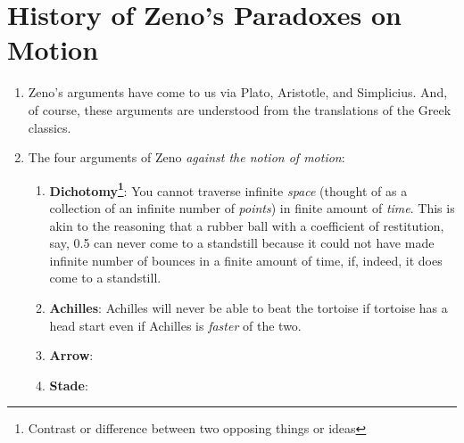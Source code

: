 \documentclass[12pt,a4paper]{book}
\begin{document}
\chapter{History of Zeno's Paradoxes on Motion}
\label{zeno}
\begin{enumerate}
    \item Zeno's arguments have come to us via Plato, Aristotle, and Simplicius. And, of course, these arguments are understood from the translations of the Greek classics.
    \item The four arguments of Zeno \emph{against the notion of motion}:
        \begin{enumerate}
            \item \textbf{Dichotomy\footnote{Contrast or difference between two opposing things or ideas}}: You cannot traverse infinite \emph{space} (thought of as a collection of an infinite number of \emph{points}) in finite amount of \emph{time}. This is akin to the reasoning that a rubber ball with a coefficient of restitution, say, 0.5 can never come to a standstill because it could not have made infinite number of bounces in a finite amount of time, if, indeed, it does come to a standstill.
            \item \textbf{Achilles}: Achilles will never be able to beat the tortoise if tortoise has a head start even if Achilles is \emph{faster} of the two.
            \item \textbf{Arrow}:
            \item \textbf{Stade}:
        \end{enumerate}
\end{enumerate}
\end{document}
